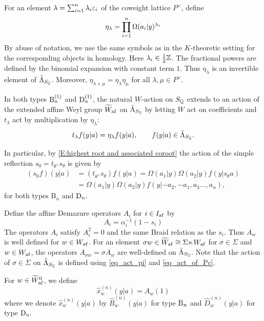 \documentclass[a4paper]{amsart}
\theoremstyle{remark}
\numberwithin{equation}{section}
\begin{document}
For an element $\lambda=\sum_{i=1}^n \lambda_i \varepsilon_i$ of the coweight lattice $P^\lor$, define 
\begin{align}
  \eta_{\lambda} = \prod_{i=1}^n \Omega(a_i| y)^{\lambda_i} 
\end{align}
By abuse of notation, we use the same symbols as in the $K$-theoretic setting for the corresponding objects in homology.
Here $\lambda_i\in\frac12\mathbb{Z}$.
The fractional powers are defined by the binomial
expansion with constant term $1$.
Thus $\eta_\lambda$ is an invertible element
of $\hat{\Lambda}_{{S_{\mathbb{Q}}}}$.
Moreover, $\eta_{\lambda+\mu}=\eta_\lambda\eta_\mu$
for all $\lambda,\mu\in P^\vee$.




In both types $\mathrm{B}_{n}^{(1)}$ and $\mathrm{D}_{n}^{(1)}$,
the natural $W$-action on ${S_{\mathbb{Q}}}$
extends to an action of the extended affine Weyl group
$\widetilde{W}_{\mathrm{af}}$ on $\hat{\Lambda}_{{S_{\mathbb{Q}}}}$
by letting $W$ act on coefficients and
$t_\lambda$ act by multiplication by $\eta_\lambda$:
\begin{equation}\label{eq_act_of_Pc}
t_\lambda f(y| a)=\eta_\lambda f(y| a),
\qquad
f(y| a)\in\hat{\Lambda}_{{S_{\mathbb{Q}}}}.
\end{equation}



In particular, by \eqref{E:highest root and associated coroot} the action of the simple reflection $s_0=t_{\theta^\lor}s_\theta$ is given by
\begin{align*}
(s_0 f)(y| a) &= (t_{\theta^\lor}s_\theta )f(y| a) 
=\Omega(a_1 |  y)\Omega(a_2 |  y) f(y| s_\theta a)\\
&= \Omega(a_1 |  y)\Omega(a_2 |  y) f(y|  -a_2, -a_1,a_3 \dotsc, a_n),
\end{align*}
for both types $\mathrm{B}_n$ and $\mathrm{D}_{n}.$


Define the affine Demazure operators $A_i$ 
for $i\in I_{\mathrm{af}}$ by 
\begin{equation}
A_i=\alpha_i^{-1}(1-s_i)
\end{equation}
The operators $A_i$ satisfy $A_i^2=0$ and the same Braid relation as the $s_i$. Thus $A_w$ is well defined for $w\in W_{\mathrm{af}}$.
For an element $\sigma w\in\widetilde{W}_{\mathrm{af}}\cong \Sigma {\ltimes} W_{\mathrm{af}}$ for $\sigma\in\Sigma$ and $w\in W_{\mathrm{af}}$, the operators  
$A_{\sigma w} = \sigma A_w$ are well-defined on $\hat{\Lambda}_{{S_{\mathbb{Q}}}}$. Note that the action of $\sigma\in \Sigma$ on $\hat{\Lambda}_{{S_{\mathbb{Q}}}}$ is defined using \eqref{eq_act_pi} and \eqref{eq_act_of_Pc}.

For $w\in \widetilde{W}_{\mathrm{af}}^0$, we define
\begin{equation}
\widehat{x}_{w}^{(n)}(y| a)=A_w (1)
\end{equation}
where we denote $\widehat{x}_{w}^{(n)}(y| a)$ by
${\widehat{B}}_{w}^{(n)}(y| a)$ for type $\mathrm{B}_{n}$
and $\widehat{D}_{w}^{(n)}(y| a)$ for type $\mathrm{D}_{n}.$ 
\end{document}
